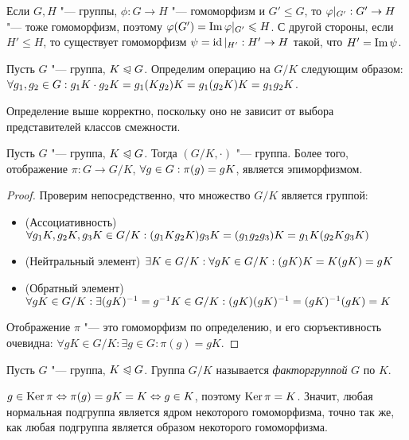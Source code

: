 \begin{note}
	Если $G, H$ "--- группы, $\phi: G \to H$ "--- гомоморфизм и $G' \le G$, то $\phi|_{G'}: G' \hm\to H$ "--- тоже гомоморфизм, поэтому $\phi(G') \hm= \im\phi|_{G'} \le H$. С другой стороны, если $H' \le H$, то существует гомоморфизм $\psi = \operatorname{id}|_{H'}: H' \to H$ такой, что $H' = \operatorname{Im}\psi$.
\end{note}

\begin{definition}
	Пусть $G$ "--- группа, $K \trianglelefteqslant G$. Определим операцию на $G / K$ следующим образом: $\forall g_1, g_2 \in G: g_1K\cdot g_2K \hm= g_1(Kg_2)K = g_1(g_2K)K = g_1g_2K$.
\end{definition}

\begin{note}
	Определение выше корректно, поскольку оно не зависит от выбора представителей классов смежности.
\end{note}

\begin{proposition}
	Пусть $G$ "--- группа, $K \trianglelefteqslant G$. Тогда $(G / K, \cdot)$ "--- группа. Более того, отображение $\pi: G \to G / K$, $\forall g \in G: \pi(g) \hm= gK$, является эпиморфизмом.
\end{proposition}

\begin{proof}
	Проверим непосредственно, что множество $G / K$ является группой:
	\begin{itemize}
		\item (Ассоциативность) $\forall g_1K, g_2K, g_3K \in G / K: (g_1Kg_2K)g_3K \hm= (g_1g_2g_3)K \hm= g_1K(g_2Kg_3K)$
		\item (Нейтральный элемент) $\exists K \in G / K: \forall gK \in G / K: (gK)K \hm= K(gK) = gK$
		\item (Обратный элемент) $\forall gK \in G / K: \exists (gK)^{-1} = g^{-1}K \in G / K: (gK)(gK)^{-1} \hm= (gK)^{-1}(gK) = K$
	\end{itemize}
	
	Отображение $\pi$ "--- это гомоморфизм по определению, и его сюръективность очевидна: $\forall gK \in G / K: \exists g \in G: \pi(g) = gK$.
\end{proof}

\begin{definition}
	Пусть $G$ "--- группа, $K \trianglelefteqslant G$. Группа $G / K$ называется \textit{факторгруппой} $G$ по $K$.
\end{definition}

\begin{note}
	$g \in \operatorname{Ker}\pi \Leftrightarrow \pi(g) = gK = K \Leftrightarrow g \in K$, поэтому $\operatorname{Ker}\pi = K$. Значит, любая нормальная подгруппа является ядром некоторого гомоморфизма, точно так же, как любая подгруппа является образом некоторого гомоморфизма.
\end{note}

